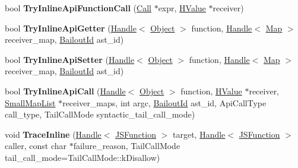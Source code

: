 \begin{DoxyCompactItemize}
\item 
bool {\bfseries Try\+Inline\+Api\+Function\+Call} (\hyperlink{classv8_1_1internal_1_1_call}{Call} $\ast$expr, \hyperlink{classv8_1_1internal_1_1_h_value}{H\+Value} $\ast$receiver)\hypertarget{classv8_1_1internal_1_1_h_optimized_graph_builder_a57f055b89c98b5dbd085635ebdba1897}{}\label{classv8_1_1internal_1_1_h_optimized_graph_builder_a57f055b89c98b5dbd085635ebdba1897}

\item 
bool {\bfseries Try\+Inline\+Api\+Getter} (\hyperlink{classv8_1_1internal_1_1_handle}{Handle}$<$ \hyperlink{classv8_1_1internal_1_1_object}{Object} $>$ function, \hyperlink{classv8_1_1internal_1_1_handle}{Handle}$<$ \hyperlink{classv8_1_1internal_1_1_map}{Map} $>$ receiver\+\_\+map, \hyperlink{classv8_1_1internal_1_1_bailout_id}{Bailout\+Id} ast\+\_\+id)\hypertarget{classv8_1_1internal_1_1_h_optimized_graph_builder_a8fd0467b813304b67bb8a1a4049a9685}{}\label{classv8_1_1internal_1_1_h_optimized_graph_builder_a8fd0467b813304b67bb8a1a4049a9685}

\item 
bool {\bfseries Try\+Inline\+Api\+Setter} (\hyperlink{classv8_1_1internal_1_1_handle}{Handle}$<$ \hyperlink{classv8_1_1internal_1_1_object}{Object} $>$ function, \hyperlink{classv8_1_1internal_1_1_handle}{Handle}$<$ \hyperlink{classv8_1_1internal_1_1_map}{Map} $>$ receiver\+\_\+map, \hyperlink{classv8_1_1internal_1_1_bailout_id}{Bailout\+Id} ast\+\_\+id)\hypertarget{classv8_1_1internal_1_1_h_optimized_graph_builder_a2cec7244a463c1aaddfca6cef8cc6fa8}{}\label{classv8_1_1internal_1_1_h_optimized_graph_builder_a2cec7244a463c1aaddfca6cef8cc6fa8}

\item 
bool {\bfseries Try\+Inline\+Api\+Call} (\hyperlink{classv8_1_1internal_1_1_handle}{Handle}$<$ \hyperlink{classv8_1_1internal_1_1_object}{Object} $>$ function, \hyperlink{classv8_1_1internal_1_1_h_value}{H\+Value} $\ast$receiver, \hyperlink{classv8_1_1internal_1_1_small_map_list}{Small\+Map\+List} $\ast$receiver\+\_\+maps, int argc, \hyperlink{classv8_1_1internal_1_1_bailout_id}{Bailout\+Id} ast\+\_\+id, Api\+Call\+Type call\+\_\+type, Tail\+Call\+Mode syntactic\+\_\+tail\+\_\+call\+\_\+mode)\hypertarget{classv8_1_1internal_1_1_h_optimized_graph_builder_af647bbab6fcd5913019071302ab58760}{}\label{classv8_1_1internal_1_1_h_optimized_graph_builder_af647bbab6fcd5913019071302ab58760}

\item 
void {\bfseries Trace\+Inline} (\hyperlink{classv8_1_1internal_1_1_handle}{Handle}$<$ \hyperlink{classv8_1_1internal_1_1_j_s_function}{J\+S\+Function} $>$ target, \hyperlink{classv8_1_1internal_1_1_handle}{Handle}$<$ \hyperlink{classv8_1_1internal_1_1_j_s_function}{J\+S\+Function} $>$ caller, const char $\ast$failure\+\_\+reason, Tail\+Call\+Mode tail\+\_\+call\+\_\+mode=Tail\+Call\+Mode\+::k\+Disallow)\hypertarget{classv8_1_1internal_1_1_h_optimized_graph_builder_aa7e808ca0729de94be11d20522a774c9}{}\label{classv8_1_1internal_1_1_h_optimized_graph_builder_aa7e808ca0729de94be11d20522a774c9}


\end{DoxyCompactItemize}
